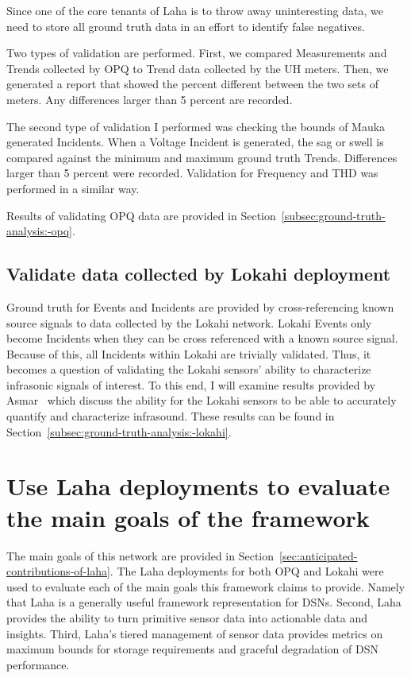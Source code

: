 Since one of the core tenants of Laha is to throw away uninteresting data, we need to store all ground truth data in an effort to identify false negatives.

Two types of validation are performed. First, we compared Measurements and Trends collected by OPQ to Trend data collected by the UH meters. Then, we generated a report that showed the percent different between the two sets of meters. Any differences larger than 5 percent are recorded.

The second type of validation I performed was checking the bounds of Mauka generated Incidents. When a Voltage Incident is generated, the sag or swell is compared against the minimum and maximum ground truth Trends. Differences larger than 5 percent were recorded. Validation for Frequency and THD was performed in a similar way.

Results of validating OPQ data are provided in Section~\ref{subsec:ground-truth-analysis:-opq}.

\subsection{Validate data collected by Lokahi deployment}\label{subsec:validate-data-collected-by-lokahi-deployment}

Ground truth for Events and Incidents are provided by cross-referencing known source signals to data collected by the Lokahi network. Lokahi Events only become Incidents when they can be cross referenced with a known source signal. Because of this, all Incidents within Lokahi are trivially validated. Thus, it becomes a question of validating the Lokahi sensors' ability to characterize infrasonic signals of interest. To this end, I will examine results provided by Asmar~\cite{asmar19} which discuss the ability for the Lokahi sensors to be able to accurately quantify and characterize infrasound. These results can be found in Section~\ref{subsec:ground-truth-analysis:-lokahi}.

\section{Use Laha deployments to evaluate the main goals of the framework}\label{sec:use-laha-deployments-to-evaluate-the-main-goals-of-the-framework}
The main goals of this network are provided in Section~\ref{sec:anticipated-contributions-of-laha}. The Laha deployments for both OPQ and Lokahi were used to evaluate each of the main goals this framework claims to provide. Namely that Laha is a generally useful framework representation for DSNs. Second, Laha provides the ability to turn primitive sensor data into actionable data and insights. Third, Laha's tiered management of sensor data provides metrics on maximum bounds for storage requirements and graceful degradation of DSN performance.

